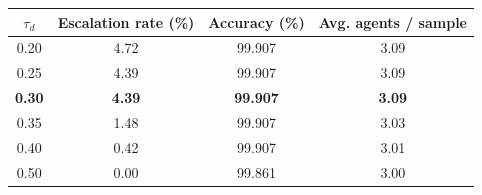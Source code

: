 \begin{tabular}{cccc}
\toprule
$\tau_d$ & Escalation rate (\%) & Accuracy (\%) & Avg. agents / sample \\
\midrule
0.20 & 4.72 & 99.907 & 3.09 \\
0.25 & 4.39 & 99.907 & 3.09 \\
\textbf{0.30} & \textbf{4.39} & \textbf{99.907} & \textbf{3.09} \\
0.35 & 1.48 & 99.907 & 3.03 \\
0.40 & 0.42 & 99.907 & 3.01 \\
0.50 & 0.00 & 99.861 & 3.00 \\
\bottomrule
\end{tabular}
